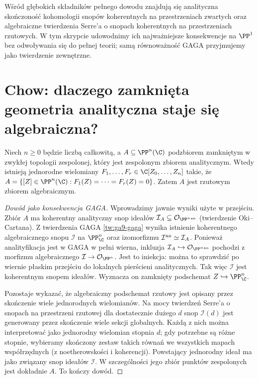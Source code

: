\begin{uwaga}
Wśród głębokich składników pełnego dowodu znajdują się
analityczna skończoność kohomologii snopów koherentnych
na przestrzeniach zwartych oraz algebraiczne twierdzenia
Serre'a o snopach koherentnych na przestrzeniach rzutowych.
W tym skrypcie udowodnimy ich najważniejsze konsekwencje
na $\PP^1$ bez odwoływania się do pełnej teorii; samą
równoważność GAGA przyjmujemy jako twierdzenie zewnętrzne.
\end{uwaga}

\section{Chow: dlaczego zamknięta geometria analityczna staje się algebraiczna?}
\label{sec:ga9-chow}

\begin{twierdzenie}[Chow]
\label{tw:ga9-chow}
Niech $n\ge0$ będzie liczbą całkowitą, a
$A\subseteq\PP^n(\C)$ podzbiorem zamkniętym
w zwykłej topologii zespolonej, który
jest zespolonym zbiorem analitycznym. Wtedy istnieją
jednorodne wielomiany $F_1,\ldots,F_r\in\C[Z_0,\ldots,Z_n]$
takie, że
$A=\{[Z]\in\PP^n(\C):F_1(Z)=\cdots=F_r(Z)=0\}$.
Zatem $A$ jest rzutowym zbiorem algebraicznym.
\end{twierdzenie}
\begin{proof}[Dowód jako konsekwencja GAGA]
Wprowadzimy jawnie wyniki użyte w przejściu.
Zbiór $A$ ma koherentny analityczny snop ideałów
$\mathcal I_A\subseteq\mathcal O_{\PP^n{}^{\rm an}}$
(twierdzenie Oki--Cartana). Z twierdzenia GAGA
\ref{tw:ga9-gaga} wynika istnienie koherentnego
algebraicznego snopu $\mathcal I$ na $\PP^n_\C$
oraz izomorfizmu $\mathcal I^{\rm an}\simeq\mathcal I_A$.
Ponieważ analityfikacja jest w GAGA w pełni wierna,
inkluzja $\mathcal I_A\hookrightarrow\mathcal O_{\PP^n{}^{\rm an}}$
pochodzi z morfizmu algebraicznego
$\mathcal I\to\mathcal O_{\PP^n}$. Jest to iniekcja:
można to sprawdzić po wiernie płaskim przejściu do
lokalnych pierścieni analitycznych. Tak więc
$\mathcal I$ jest koherentnym snopem ideałów.
Wyznacza on zamknięty podschemat
$Z\hookrightarrow\PP^n_\C$.

Pozostaje wykazać, że algebraiczny podschemat rzutowy
jest opisany przez skończenie wiele jednorodnych
wielomianów. Na mocy twierdzeń Serre'a o snopach
na przestrzeni rzutowej dla dostatecznie dużego $d$
snop $\mathcal I(d)$ jest generowany przez skończenie
wiele sekcji globalnych. Każdą z nich można
interpretować jako jednorodny wielomian stopnia $d$;
gdy potrzebne są różne stopnie, wybieramy skończony
zestaw takich równań we wszystkich mapach współrzędnych
(z noetherowskości i koherencji). Powstający
jednorodny ideał ma jako związany snop ideałów
$\mathcal I$. W szczególności jego zbiór punktów
zespolonych jest dokładnie $A$. To kończy dowód.
\end{proof}

